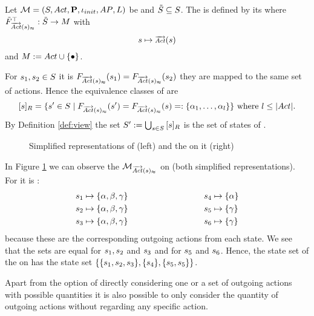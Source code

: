 \documentclass[preview]{standalone}
\begin{document}
\begin{definition}
	Let ${{{\mathcal{M}}}} = {{({S}, {Act}, {\textbf{P}}, {\iota_{init}}, {AP}, {L})}}$ be \achgphN and ${\tilde{{S}}} \subseteq {S}$. The \viewN \viewweakoutactident is defined by its \grpfctN \gfctweakoutactident where $\gfctsubweakoutactident : \smstates \to \imggrp$ with
	\[
	\state \mapsto \outacts(\state)
	\]
	and $\imggrp := \actions \cup \remset$.
\end{definition}

For ${s}_1, {s}_2 \in {S}$ it is $\gfctweakoutactident(\state_1) = \gfctweakoutactident(\state_2)$ \iffN they are mapped to the same set of actions. Hence the equivalence classes of \eqrelview are
\[
	\eqclassv = \{ \state' \in \states \mid \gfctweakoutactident(\state') = \gfctweakoutactident(\state) =: \{\action_1, \dots, \action_l\}\} \text{ where } l \leq |\actions|.
\]
By Definition \ref{def:view} the set ${S}' := \bigcup_{{s} \in {S}} {{[{s}]_{{R}}}}$ is the set of states of \viewweakoutactident.

\begin{figure}[!htb]
	\begin{minipage}{.5\textwidth}
		\hspace{5mm}
		
	\end{minipage}%
	\begin{minipage}{.5\textwidth}				
		\hspace{5mm}
		
	\end{minipage}	
	\caption{Simplified representations of \mdp (left) and the \viewN \viewweakoutactident on it (right)}	
	\label{fig:outActIdentWeakAfter} 	
\end{figure}

\begin{exmp}
	In Figure \ref{fig:outActIdentWeakAfter} we can observe the \viewN $\viewweakoutactident$ on \chgph (both simplified representations). 
For \viewweakoutactident it is \gfctweakoutactident :
\begin{alignat*}{3}
	&{s}_1 \mapsto \{{\alpha}, {\beta}, {\gamma}\} \quad\quad\quad\quad\quad\quad\quad\quad &&{s}_4 \mapsto \{{\alpha}\}\\
	&{s}_2 \mapsto \{{\alpha}, {\beta}, {\gamma}\} &&{s}_5 \mapsto \{{\gamma}\}\\
	&{s}_3 \mapsto \{{\alpha}, {\beta}, {\gamma}\} &&{s}_6 \mapsto \{{\gamma}\}
\end{alignat*}
because these are the corresponding outgoing actions from each state. We see that the sets are equal for ${s}_1,{s}_2$ and ${s}_3$ and for ${s}_5$ and ${s}_6$. Hence, the state set of the \viewN \viewweakoutactident on \chgph has the state set $\{\{{s}_1, {s}_2, {s}_3\}, \{{s}_4\}, \{{s}_5, {s}_5\}\}$.
\end{exmp}
Apart from the option of directly considering one or a set of outgoing actions with possible quantities it is also possible to only consider the quantity of outgoing actions without regarding any specific action.
\end{document}
